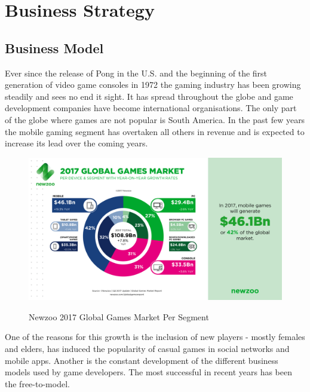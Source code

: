 \documentclass[12p]{article}
\begin{document}
\newpage
\section{Business Strategy} \label{MarketAnalysis}

\subsection{Business Model} 
Ever since the release of Pong in the U.S. and the beginning of the first generation of video game consoles in 1972 the gaming industry has been growing steadily and sees no end it sight. It has spread throughout the globe and game development companies have become international organisations. The only part of the globe where games are not popular is South America.\cite{GamesMarketRevenue} In the past few years the mobile gaming segment has overtaken all others in revenue and is expected to increase its lead over the coming years.

\begin{figure}[ht]
    \center
    \includegraphics[width=1\textwidth]{BusinessStrategy/Newzoo_2017_Global_Games_Market_Per_Segment_April_2017}
    \label{Newzoo_2017_Global_Games_Market_Per_Segment_April_2017}
    \caption{Newzoo 2017 Global Games Market Per Segment \cite{NezooScreenshot}}
\end{figure}

One of the reasons for this growth is the inclusion of new players - mostly females and elders, has induced the popularity of casual games in social networks and mobile apps. Another is the constant development of the different business models used by game developers. The most successful in recent years has been the free-to-model.\cite{BusinessModelsAndStrategy}
\end{document}
